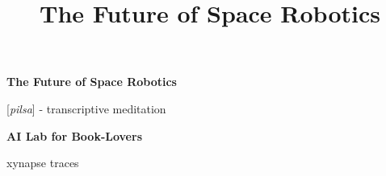 
\title{The Future of Space Robotics} %
\thispagestyle{empty}
\begin{center}
\vspace*{1.5in}
{\sffamily\Huge\bfseries The Future of Space Robotics\par}
\vfill
{\fontsize{120}{144}\selectfont\sffamily\bfseries{}\par}
\vspace{0.5em}
{\sffamily\large [\textit{pilsa}] - transcriptive meditation\par}
\vfill
{\sffamily\Large\bfseries AI Lab for Book-Lovers\par}
\vfill
{\logofont\large xynapse traces\par}
\end{center}
